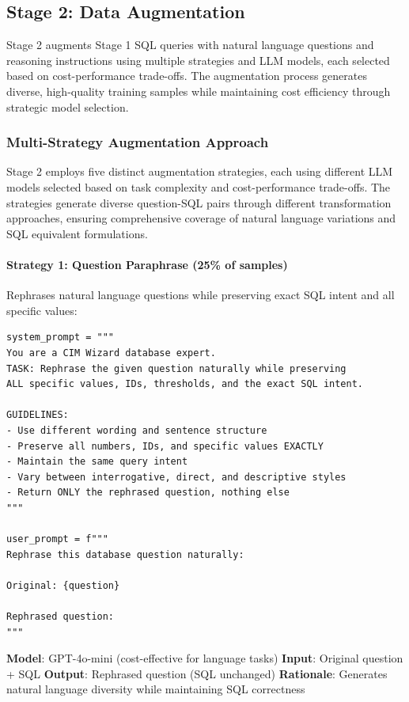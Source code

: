 \subsection{Stage 2: Data Augmentation}

Stage 2 augments Stage 1 SQL queries with natural language questions and reasoning instructions using multiple strategies and LLM models, each selected based on cost-performance trade-offs. The augmentation process generates diverse, high-quality training samples while maintaining cost efficiency through strategic model selection.

\subsubsection{Multi-Strategy Augmentation Approach}

Stage 2 employs five distinct augmentation strategies, each using different LLM models selected based on task complexity and cost-performance trade-offs. The strategies generate diverse question-SQL pairs through different transformation approaches, ensuring comprehensive coverage of natural language variations and SQL equivalent formulations.

\paragraph{Strategy 1: Question Paraphrase (25\% of samples)}

Rephrases natural language questions while preserving exact SQL intent and all specific values:

\begin{lstlisting}[style=pythonstyle, caption=Question paraphrase strategy]
system_prompt = """
You are a CIM Wizard database expert.
TASK: Rephrase the given question naturally while preserving 
ALL specific values, IDs, thresholds, and the exact SQL intent.

GUIDELINES:
- Use different wording and sentence structure
- Preserve all numbers, IDs, and specific values EXACTLY
- Maintain the same query intent
- Vary between interrogative, direct, and descriptive styles
- Return ONLY the rephrased question, nothing else
"""

user_prompt = f"""
Rephrase this database question naturally:

Original: {question}

Rephrased question:
"""
\end{lstlisting}

\textbf{Model}: GPT-4o-mini (cost-effective for language tasks)
\textbf{Input}: Original question + SQL
\textbf{Output}: Rephrased question (SQL unchanged)
\textbf{Rationale}: Generates natural language diversity while maintaining SQL correctness

